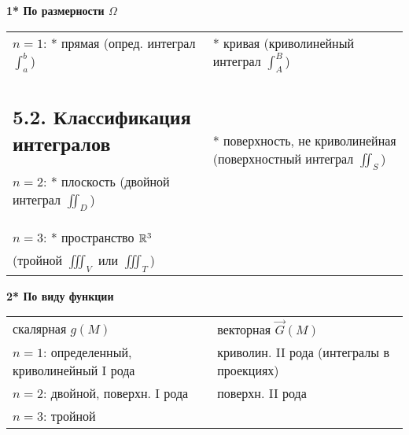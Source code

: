 \documentclass[12pt]{article}
\begin{document}
    \textbf{1* По размерности $\Omega$}

    \begin{tabular}{p{8cm}p{8cm}}
        $n = 1$: * прямая (опред. интеграл $\int_a^b$)    & * кривая (криволинейный интеграл $\int_A^B$)                       \\
    \subsection{5.2. Классификация интегралов}

        $n = 2$: * плоскость (двойной интеграл $\iint_D$) & * поверхность, не криволинейная (поверхностный интеграл $\iint_S$) \\

        $n = 3$: * пространство $\mathbb{R}^3$  \\
        (тройной $\iiint_V$ или $\iiint_T$)

    \end{tabular}


    \textbf{2* По виду функции}

    \begin{tabular}{p{8cm}p{8cm}}
        скалярная $g(M)$                            & векторная $\overrightarrow{G}(M)$         \\

        $n = 1$: определенный, криволинейный I рода & криволин. II рода (интегралы в проекциях) \\

        $n = 2$: двойной, поверхн. I рода            & поверхн. II рода                          \\

        $n = 3$: тройной
    \end{tabular}
\end{document}

